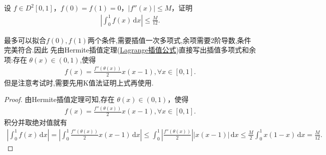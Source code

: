 \documentclass[../../main.tex]{subfiles}%
\begin{document}
\begin{example}
设 $f \in D^2[0,1]$，$f(0) = f(1) = 0$，$|f''(x)| \leqslant  M$，证明
\begin{align*}
\left| \int_{0}^{1} f(x) \, \mathrm{d}x \right| \leqslant  \frac{M}{12}.
\end{align*}
\end{example}
\begin{note}
最多可以拟合$f(0),f(1)$两个条件,需要插值一次多项式,余项需要2阶导数,条件完美符合.因此
先由Hermite插值定理(\hyperref[proposition:Lagrange插值公式]{Lagrange插值公式})直接写出插值多项式和余项:存在 $\theta(x) \in (0,1)$,使得
\begin{align*}
f(x) = \frac{f''(\theta(x))}{2} x (x - 1), \forall x \in [0,1].
\end{align*}
但是注意考试时,需要先用K值法证明上式再使用.
\end{note}
\begin{proof}
由Hermite插值定理可知,存在 $\theta(x) \in (0,1)$，使得
\begin{align*}
f(x) = \frac{f''(\theta(x))}{2} x (x - 1), \forall x \in [0,1].
\end{align*}
积分并取绝对值就有
\begin{align*}
\left| \int_{0}^{1} f(x) \, \mathrm{d}x \right| = \left| \int_{0}^{1} \frac{f''(\theta(x))}{2} x (x - 1) \, \mathrm{d}x \right| \leqslant  \int_{0}^{1} \left| \frac{f''(\theta(x))}{2} \right| \left| x (x - 1) \right| \, \mathrm{d}x 
\leqslant  \frac{M}{2} \int_{0}^{1} x (1 - x) \, \mathrm{d}x = \frac{M}{12}.
\end{align*}
\end{proof}
\end{document}
